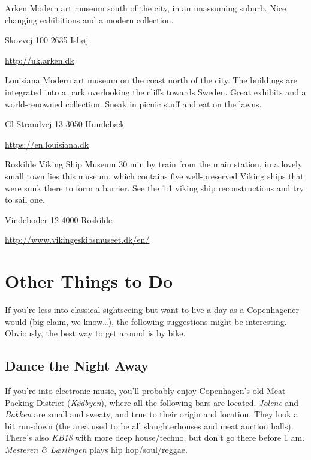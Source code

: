 \begin{funitem}
{Arken}
{Modern art museum south of the city, in an unassuming suburb. Nice changing exhibitions and a modern collection. }
{\begin{addr}
{Skovvej 100}
{2635 Ishøj}
\end{addr}}
{\url{http://uk.arken.dk}}
{\begin{ohours}
{}
{}
{}
{}
{}
{}
{}
{}
\end{ohours}}
\end{funitem}
\begin{funitem}
{Louisiana}
{Modern art museum on the coast north of the city. The buildings are integrated into a park overlooking the cliffs towards Sweden. Great exhibits and a world-renowned collection. Sneak in picnic stuff and eat on the lawns.}
{\begin{addr}
{Gl Strandvej 13}
{3050 Humlebæk}
\end{addr}}
{\url{https://en.louisiana.dk}}
{\begin{ohours}
{}
{}
{}
{}
{}
{}
{}
{}
\end{ohours}}
\end{funitem}
\begin{funitem}
{Roskilde Viking Ship Museum}
{30 min by train from the main station, in a lovely small town lies this museum, which contains five well-preserved Viking ships that were sunk there to form a barrier. See the 1:1 viking ship reconstructions and try to sail one.}
{\begin{addr}
{Vindeboder 12}
{4000 Roskilde}
\end{addr}}
{\url{http://www.vikingeskibsmuseet.dk/en/}}
{\begin{ohours}
{}
{}
{}
{}
{}
{}
{}
{}
\end{ohours}}
\end{funitem}



\section{Other Things to Do}
If you’re less into classical sightseeing but want to live a day as a Copenhagener would (big claim, we know\dots), the following suggestions might be interesting. Obviously, the best way to get around is by bike.

\subsection{Dance the Night Away}
If you’re into electronic music, you’ll probably enjoy Copenhagen’s old Meat Packing District (\textit{Kødbyen}), where all the following bars are located. \textit{Jolene} and \textit{Bakken} are small and sweaty, and true to their origin and location. They look a bit run-down (the area used to be all slaughterhouses and meat auction halls). There’s also \textit{KB18} with more deep house/techno, but don’t go there before 1 am. \textit{Mesteren \& Lærlingen} plays hip hop/soul/reggae.

